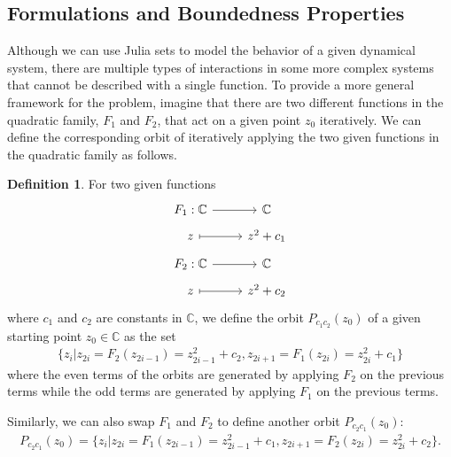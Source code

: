 \documentclass{amsart}
\theoremstyle{plain}
\theoremstyle{definition}
\newtheorem{definition}[theorem]{Definition}
\theoremstyle{remark}
\numberwithin{equation}{section}
\newcommand{\C}{\mathbb{C}}
\begin{document}
\subsection{Formulations and Boundedness Properties} 
 Although we can use Julia sets to model the behavior of a given dynamical system, there are multiple types of interactions in some more complex systems that cannot be described with a single function. To provide a more general framework for the problem, imagine that there are two different functions in the quadratic family, $F_1$ and $F_2$, that act on a given point $z_0$ iteratively. We can define the corresponding orbit of iteratively applying the two given functions in the quadratic family as follows.
\begin{definition}
    For two given functions 
        \[
      \begin{tikzcd}[row sep=tiny]
        F_1: \C \arrow[r] & \C \\
        z \arrow[r, mapsto] & z^2 + c_1 \end{tikzcd}\]
        \[\begin{tikzcd}[row sep=tiny]
        F_2: \C \arrow[r] & \C \\
        z \arrow[r, mapsto] & z^2 + c_2 
      \end{tikzcd}\]
     where $c_1$ and $c_2$ are constants in $\C$, we define the orbit $P_{c_1c_2}(z_0)$ of a given starting point $z_0\in\C$ as the set \begin{align*}
         \{z_i|z_{2i} = F_2(z_{2i-1}) = z_{2i-1}^2+c_2, z_{2i+1} = F_1(z_{2i})=z_{2i}^2+c_1\}
     \end{align*} where the even terms of the orbits are generated by applying $F_2$ on the previous terms while the odd terms are generated by applying $F_1$ on the previous terms.
\end{definition}
Similarly, we can also swap $F_1$ and $F_2$ to define another orbit $P_{c_2c_1}(z_0)$:   
\begin{align*}
        P_{c_2c_1}(z_0) = \{z_i|z_{2i} = F_1(z_{2i-1}) = z_{2i-1}^2+c_1, z_{2i+1} = F_2(z_{2i})=z_{2i}^2+c_2\}.
    \end{align*}
\end{document}
